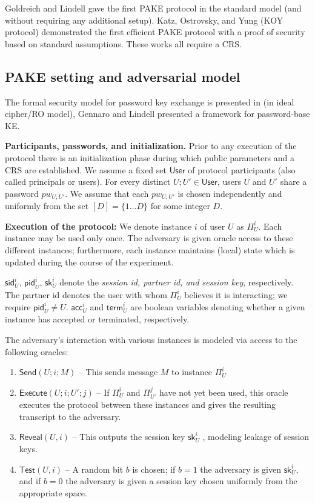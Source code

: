 \documentclass[11pt]{article}
\newcommand{\class}[1]{{\ensuremath{\mathsf{#1}}}}
\newcommand{\sid}{\class{sid}}
\newcommand{\pid}{\class{pid}}
\newcommand{\sk}{\class{sk}}
\newcommand{\user}{\class{User}}
\newcommand{\iU}{\ensuremath{\Pi^i_U}}
\newcommand{\jU}{\ensuremath{\Pi^j_{U'}}}
\newcommand{\acc}{\class{acc}}
\newcommand{\term}{\class{term}}
\begin{document}
Goldreich and Lindell \cite{GoldreichL06} gave the first PAKE protocol in the standard model (and without requiring any additional setup). Katz, Ostrovsky, and Yung (KOY protocol) demonstrated the first efficient PAKE protocol with a proof of security based on standard assumptions. These works all require a CRS.


\subsection{PAKE setting and adversarial model}

The formal security model for password key exchange is presented in \cite{DBLP:conf/eurocrypt/BellarePR00} (in ideal cipher/RO model), Gennaro and Lindell \cite{DBLP:journals/tissec/GennaroL06} presented a framework for password-base KE.

\textbf{Participants, passwords, and initialization.} Prior to any execution of the protocol there is an
initialization phase during which public parameters and a CRS are established. We assume a fixed set $\user$ of protocol participants (also called principals or users). For every distinct $U; U' \in \user$, users $U$ and $U'$ share a password $pw_{U;U'}$. We assume that each $pw_{U;U'}$ is chosen independently and uniformly from the set $[D]= \{1 \ldots D\}$ for some integer $D$.

\textbf{Execution of the protocol:} We denote instance $i$ of user $U$ as $\Pi^i_U$. Each instance may be used only once. The adversary is given oracle access to these different instances; furthermore,
each instance maintains (local) state which is updated during the course of the experiment.

$\sid^i_U$, $\pid^i_U$, $\sk^i_U$ denote the \emph{session id, partner id, and session key}, respectively. The partner id denotes the user with whom $\Pi^i_U$ believes it is interacting; we require $\pid^i_U \ne U$. $\acc^i_U$ and $\term^i_U$ are boolean variables denoting whether a given instance has accepted or
terminated, respectively.

The adversary's interaction with various instances is modeled via access to the following oracles:
\begin{enumerate}
\item $\class{Send}(U; i; M)$ -- This sends message $M$ to instance $\Pi^i_U$
\item $\class{Execute}(U; i; U'; j)$ -- If $\iU$ and $\jU$ have not yet been used, this oracle executes the protocol between these instances and gives the resulting transcript to the adversary.
\item $\class{Reveal}(U, i)$ -- This outputs the session key $\sk^i_U$ , modeling leakage of session keys.
\item $\class{Test}(U, i)$ -- A random bit $b$ is chosen; if $b = 1$ the adversary is given $\sk^i_U$, and if $b = 0$ the adversary is given a session key chosen uniformly from the appropriate space.
\end{enumerate}
\end{document}
